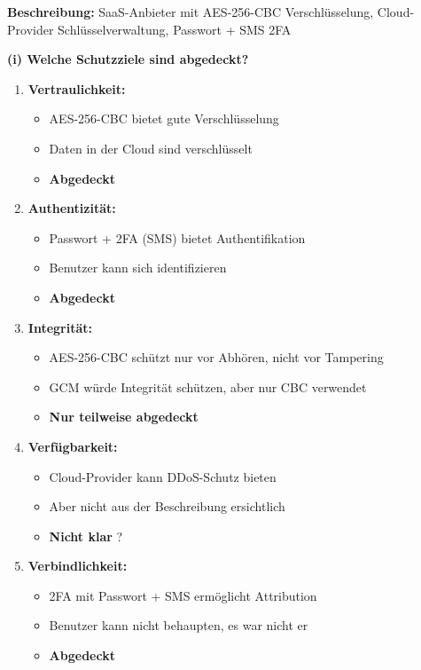 \documentclass[12pt,a4paper]{article}
\begin{document}
\begin{tcolorbox}[colback=solutionbg, colframe=black!30]

\textbf{Beschreibung:} SaaS-Anbieter mit AES-256-CBC Verschlüsselung, Cloud-Provider Schlüsselverwaltung, Passwort + SMS 2FA

\textbf{(i) Welche Schutzziele sind abgedeckt?} \checkmark

\begin{enumerate}[1.]
    \item \textbf{Vertraulichkeit:}
    \begin{itemize}
        \item AES-256-CBC bietet gute Verschlüsselung
        \item Daten in der Cloud sind verschlüsselt
        \item \textbf{Abgedeckt} \checkmark
    \end{itemize}
    
    \item \textbf{Authentizität:}
    \begin{itemize}
        \item Passwort + 2FA (SMS) bietet Authentifikation
        \item Benutzer kann sich identifizieren
        \item \textbf{Abgedeckt} \checkmark
    \end{itemize}
    
    \item \textbf{Integrität:}
    \begin{itemize}
        \item AES-256-CBC schützt nur vor Abhören, nicht vor Tampering
        \item GCM würde Integrität schützen, aber nur CBC verwendet
        \item \textbf{Nur teilweise abgedeckt}
    \end{itemize}
    
    \item \textbf{Verfügbarkeit:}
    \begin{itemize}
        \item Cloud-Provider kann DDoS-Schutz bieten
        \item Aber nicht aus der Beschreibung ersichtlich
        \item \textbf{Nicht klar} ?
    \end{itemize}
    
    \item \textbf{Verbindlichkeit:}
    \begin{itemize}
        \item 2FA mit Passwort + SMS ermöglicht Attribution
        \item Benutzer kann nicht behaupten, es war nicht er
        \item \textbf{Abgedeckt} \checkmark
    \end{itemize}
\end{enumerate}

\end{tcolorbox}
\end{document}

